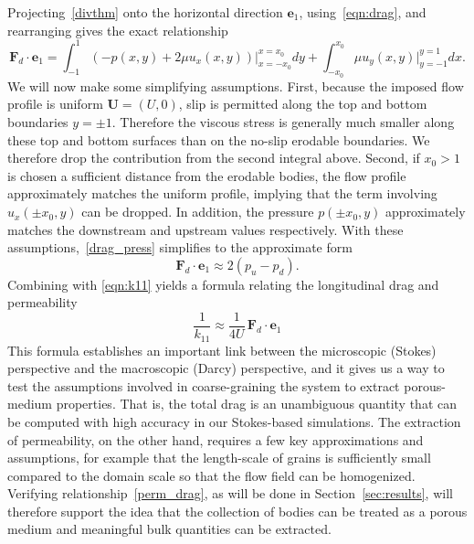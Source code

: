 \documentclass[3p]{elsarticle}
\newcommand{\UU}{{\mathbf{U}}}
\newcommand{\bvec}[1]{\mathbf{#1}}
\newcommand{\pup}{p_u}
\newcommand{\pdn}{p_d}
\newcommand{\FD}{\bvec{F}_d}
\newcommand{\ex}{ {\bvec{e}}_1}
\begin{document}
Projecting~\eqref{divthm} onto the horizontal direction $\ex$, using~\eqref{eqn:drag}, and rearranging gives the exact relationship
\begin{equation}
\label{drag_press}
\FD \cdot \ex = \int_{-1}^{1} \left( -p(x,y) + 2 \mu u_x(x,y) \right) \big|_{x=-x_0}^{x=x_0} dy + 
\int_{-x_0}^{x_0} \mu u_y(x,y) \big|_{y=-1}^{y=1} dx.
\end{equation}
We will now make some simplifying assumptions. First, because the imposed flow profile is uniform $\UU = (U,0)$, slip is permitted along the top and bottom boundaries $y=\pm 1$. Therefore the viscous stress is generally much smaller along these top and bottom surfaces than on the no-slip erodable boundaries. We therefore drop the contribution from the second integral above. Second, if $x_0 > 1$ is chosen a sufficient distance from the erodable bodies, the flow profile approximately matches the uniform profile, implying that the term involving $u_x(\pm x_0, y)$ can be dropped. In addition, the pressure $p(\pm x_0, y)$ approximately matches the downstream and upstream values respectively. With these assumptions,~\eqref{drag_press} simplifies to the approximate form
\begin{equation}
  \FD \cdot \ex \approx 2 (\pup - \pdn).
\end{equation}
Combining with \eqref{eqn:k11} yields a formula relating the longitudinal drag and permeability
\begin{equation}
  \label{perm_drag}
  \frac{1}{k_{11}} \approx \frac{1}{4 U}  \, \FD \cdot \ex
\end{equation}
This formula establishes an important link between the microscopic (Stokes) perspective and the macroscopic (Darcy) perspective, and it gives us a way to test the assumptions involved in coarse-graining the system to extract porous-medium properties. That is, the total drag is an unambiguous quantity that can be computed with high accuracy in our Stokes-based simulations. The extraction of permeability, on the other hand, requires a few key approximations and assumptions, for example that the length-scale of grains is sufficiently small compared to the domain scale so that the flow field can be homogenized. Verifying relationship~\eqref{perm_drag}, as will be done in Section~\ref{sec:results}, will therefore support the idea that the collection of bodies can be treated as a porous medium and meaningful bulk quantities can be extracted.  

\end{document}
